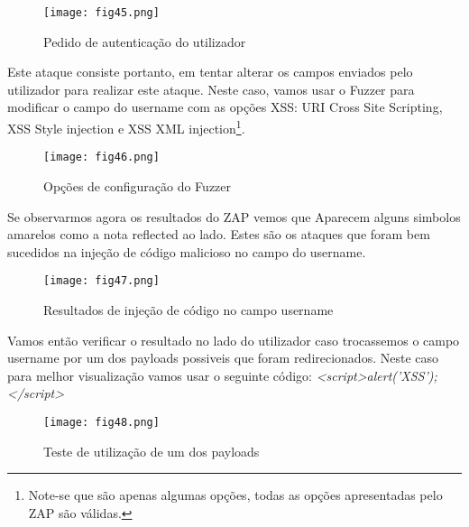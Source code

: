 \begin{figure}[H]

  \centering

  \texttt{[image: fig45.png]}

  \caption{Pedido de autenticação do utilizador}

\end{figure}



Este ataque consiste portanto, em tentar alterar os campos enviados pelo utilizador para realizar este ataque.\newline
Neste caso, vamos usar o Fuzzer para modificar o campo do username com as opções XSS: URI Cross Site Scripting, XSS Style injection e XSS XML injection\footnote[1]{ Note-se que são apenas algumas opções, todas as opções apresentadas pelo ZAP são válidas.}.
\begin{figure}[H]

  \centering

  \texttt{[image: fig46.png]}

  \caption{Opções de configuração do Fuzzer}

\end{figure}


 Se observarmos agora os resultados do ZAP vemos que Aparecem alguns simbolos amarelos como a nota reflected ao lado. Estes são os ataques que foram bem sucedidos na injeção de código malicioso no campo do username.

\begin{figure}[H]

  \centering

  \texttt{[image: fig47.png]}

  \caption{Resultados de injeção de código no campo username}

\end{figure}

Vamos então verificar o resultado no lado do utilizador caso trocassemos o campo username por um dos payloads possiveis que foram redirecionados. Neste caso para melhor visualização vamos usar o seguinte código: \textit{<script>alert('XSS');</script>}

\begin{figure}[H]

  \centering

  \texttt{[image: fig48.png]}

  \caption{Teste de utilização de um dos payloads}

\end{figure}

